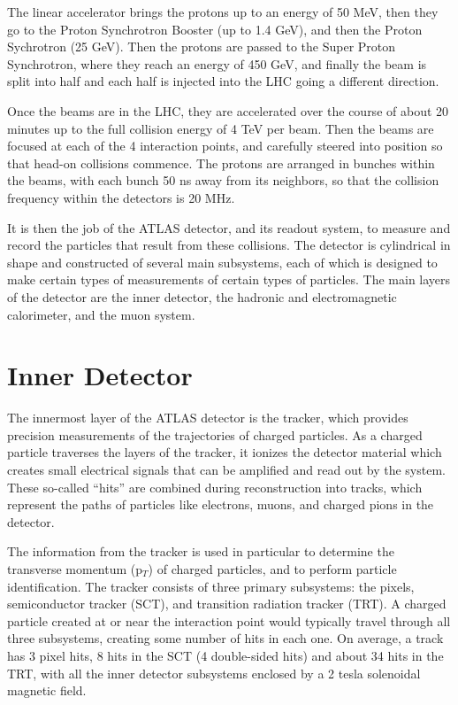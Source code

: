 The linear accelerator brings the protons up to an energy of 50 MeV, then they go to the Proton Synchrotron Booster (up to 1.4 GeV), and then the Proton Sychrotron (25 GeV).  Then the protons are passed to the Super Proton Synchrotron, where they reach an energy of 450 GeV, and finally the beam is split into half and each half is injected into the LHC going a different direction.

Once the beams are in the LHC, they are accelerated over the course of about 20 minutes up to the full collision energy of 4 TeV per beam.  Then the beams are focused at each of the 4 interaction points, and carefully steered into position so that head-on collisions commence.  The protons are arranged in bunches within the beams, with each bunch 50 ns away from its neighbors, so that the collision frequency within the detectors is 20 MHz.  

It is then the job of the ATLAS detector, and its readout system, to measure and record the particles that result from these collisions.  The detector is cylindrical in shape and constructed of several main subsystems, each of which is designed to make certain types of measurements of certain types of particles.  The main layers of the detector are the inner detector, the hadronic and electromagnetic calorimeter, and the muon system.

\section{Inner Detector}
The innermost layer of the ATLAS detector is the tracker, which provides precision measurements of the trajectories of charged particles.  As a charged particle traverses the layers of the tracker, it ionizes the detector material which creates small electrical signals that can be amplified and read out by the system.  These so-called ``hits'' are combined during reconstruction into tracks, which represent the paths of particles like electrons, muons, and charged pions in the detector.

The information from the tracker is used in particular to determine the transverse momentum (p$_T$) of charged particles, and to perform particle identification.  The tracker consists of three primary subsystems: the pixels, semiconductor tracker (SCT), and transition radiation tracker (TRT).  A charged particle created at or near the interaction point would typically travel through all three subsystems, creating some number of hits in each one.  On average, a track has 3 pixel hits, 8 hits in the SCT (4 double-sided hits) and about 34 hits in the TRT, with all the inner detector subsystems enclosed by a 2 tesla solenoidal magnetic field. 

